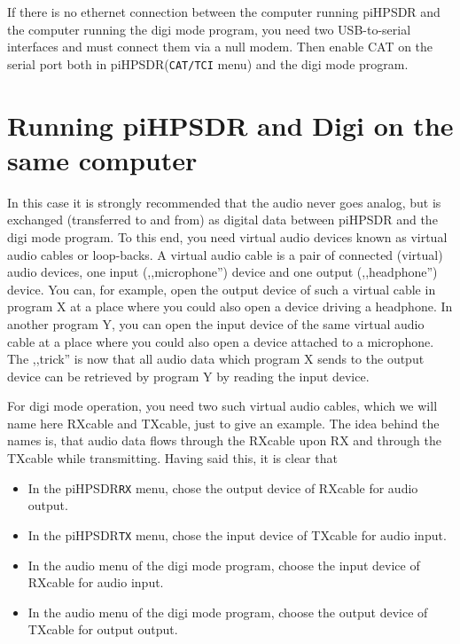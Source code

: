 \documentclass[12pt]{book}
\def\bltt#1{\texttt{\color{blue}#1}}
\def\pH{pi\-HPSDR\xspace}
\begin{document}
If there is no ethernet connection between the computer running \pH and the computer
running the digi mode program, you need two USB-to-serial interfaces and must connect them
via a null modem. Then enable CAT on the serial port both in \pH (\bltt{CAT/TCI} menu) and the
digi mode program.

\section[\pH and Digi on same computer]{Running \pH and Digi on the same computer}
In this case it is strongly recommended that the audio never goes analog, but is
exchanged (transferred to and from)
as digital data between \pH and the digi mode program. To this end, you need
virtual audio devices known as {\color{red} virtual audio cables} or {\color{red}
loop-backs}. A virtual audio cable is a pair of connected (virtual) audio devices,
one input (,,microphone'') device and one output (,,headphone'') device. You can,
for example, open the output device of such a virtual cable in program X at a place
where you could also open a device driving a headphone. In another program Y, you can
open the input device of the same virtual audio cable at a place where you could also
open a device attached to a microphone. The ,,trick'' is now that all audio data which
program X sends to the output device can be retrieved by program Y by reading the input device.



For digi mode operation, you need two such virtual audio cables, which we will name here
RXcable and TXcable, just to give an example. The idea behind the names is, that audio data
flows through the RXcable upon RX and through the TXcable while transmitting. Having said this,
it is clear that

\begin{itemize}
\item{In the \pH \bltt{RX} menu, chose the output device of RXcable for audio output.}
\item{In the \pH \bltt{TX} menu, chose the input device of TXcable for audio input.}
\item{In the audio menu of the digi mode program, choose the input device of RXcable for audio input.}
\item{In the audio menu of the digi mode program, choose the output device of TXcable for output output.}
\end{itemize}
\end{document}
